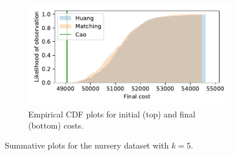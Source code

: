 \documentclass[smallextended]{svjour3}
\begin{document}
\begin{figure}
\begin{subfigure}{.5\textwidth}
        \includegraphics[width=\linewidth]{Fig7b2.pdf}
        \caption{Empirical CDF plots for initial (top) and final (bottom)
                 costs.}
    \end{subfigure}
    \caption{Summative plots for the nursery dataset with \(k=5\).}%
    \label{fig:nursery_nclasses}
\end{figure}
\end{document}
